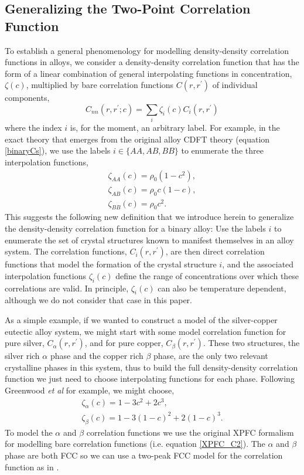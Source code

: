 \documentclass[showkeys, prb, reprint]{revtex4-1}
\begin{document}
\subsection{Generalizing the Two-Point Correlation Function} %

To establish a general phenomenology for modelling density-density correlation
functions in alloys, we consider a density-density correlation function that has the form of a linear combination of general interpolating functions in concentration, $\zeta(c)$, multiplied by bare correlation functions $C(r, r^\prime)$ of individual components,
%
\begin{equation}
    C_{nn}(r, r^\prime; c) = \sum_i \zeta_i(c) C_i(r, r^\prime)
\end{equation}
%
where the index $i$ is, for the moment, an arbitrary label. For example, in the
exact theory that emerges from the original alloy CDFT theory (equation
\ref{binaryCs}), we use the labels $i \in \lbrace AA, AB, BB\rbrace$ to enumerate the
three interpolation functions, 
%
\begin{gather}
    \zeta_{AA}(c) = \rho_0 (1 - c^2), \\
    \zeta_{AB}(c) = \rho_0 c (1 - c ), \\
    \zeta_{BB}(c) = \rho_0 c^2.
\end{gather}
%
This suggests the following new definition that we introduce herein to
generalize the density-density correlation function for a binary alloy: Use the
labels $i$ to enumerate the set of crystal structures known to manifest
themselves in an alloy system. The correlation functions, $C_i(r, r^\prime)$,
are then direct correlation functions that model the formation of the crystal structure $i$, and the associated interpolation functions $\zeta_i(c)$ define the range of concentrations over which these correlations are valid. In principle,
$\zeta_i(c)$ can also be temperature dependent, although we do not consider
that case in this paper.

As a simple example, if we wanted to construct a model of the silver-copper
eutectic alloy system, we might start with some model correlation function for
pure silver, $C_\alpha(r, r^\prime)$, and for pure copper, $C_\beta(r,
r^\prime)$. These two structures, the silver rich $\alpha$ phase and the copper
rich $\beta$ phase, are the only two relevant crystalline phases in this system,
thus to build the full density-density correlation function we just need to
choose interpolating functions for each phase. Following Greenwood \textit{et
al} for example, we might choose,
%
\begin{gather}
    \zeta_\alpha(c) = 1 - 3c^2 + 2c^3, \\
    \zeta_\beta(c) = 1 - 3 (1 - c)^2 + 2(1 - c)^3.
\end{gather}
%
To model the $\alpha$ and $\beta$ correlation functions we use the original
XPFC formalism for modelling bare correlation functions (i.e. equation
\ref{XPFC_C2}). The $\alpha$ and $\beta$ phase are both FCC
\cite{SUBRAMANIAN93} so we can use a two-peak FCC model for the correlation function as in \cite{GREENWOOD10}.
\end{document}
